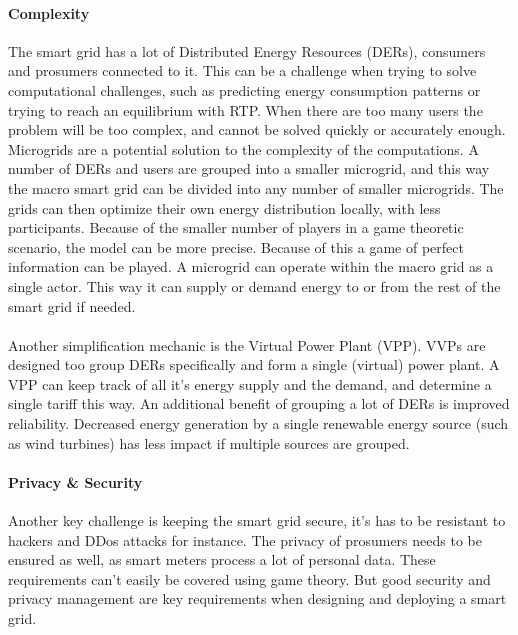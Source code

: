 \paragraph{Complexity} 
The smart grid has a lot of Distributed Energy Resources (DERs), consumers and prosumers connected to it. This can be a challenge when trying to solve computational challenges, such as predicting energy consumption patterns or trying to reach an equilibrium with RTP. When there are too many users the problem will be too complex, and cannot be solved quickly or accurately enough. \\
Microgrids are a potential solution to the complexity of the computations. A number of DERs and users are grouped into a smaller microgrid, and this way the macro smart grid can be divided into any number of smaller microgrids. The grids can then optimize their own energy distribution locally, with less participants. Because of the smaller number of players in a game theoretic scenario, the model can be more precise. Because of this a game of perfect information can be played.
A microgrid can operate within the macro grid as a single actor. This way it can supply or demand energy to or from the rest of the smart grid if needed.\\
\\
Another simplification mechanic is the Virtual Power Plant (VPP). VVPs are designed too group DERs specifically and form a single (virtual) power plant. A VPP can keep track of all it's energy supply and the demand, and determine a single tariff this way. An additional benefit of grouping a lot of DERs is improved reliability. Decreased energy generation by a single renewable energy source (such as wind turbines) has less impact if multiple sources are grouped.
\\



\paragraph{Privacy \& Security}
Another key challenge is keeping the smart grid secure, it's has to be resistant to hackers and DDos attacks for instance. The privacy of prosumers needs to be ensured as well, as smart meters process a lot of personal data. These requirements can't easily be covered using game theory. But good security and privacy management are key requirements when designing and deploying a smart grid. 

